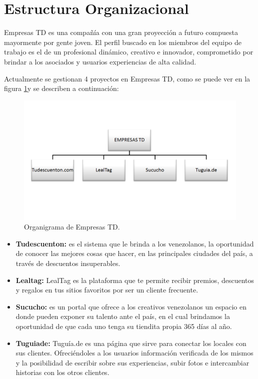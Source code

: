\section{Estructura Organizacional} \label{sect:Estructura_organizacional}

Empresas TD es una compañía con una gran proyección a futuro compuesta mayormente 
por gente joven. El perfil buscado en los miembros del equipo de trabajo es el de 
un profesional dinámico, creativo e innovador, comprometido por brindar a los
asociados y usuarios experiencias de alta calidad. 

Actualmente se gestionan 4 proyectos en Empresas TD, como se puede ver en la figura \ref{fig:ogtd}y se describen a continuación:

\begin{figure}[h]
	\begin{center}
		\includegraphics[scale=0.4]{imagenes/OrganigramaTD.png}
	\end{center}
	\caption{
		\label{fig:ogtd}
		Organigrama de Empresas TD.
	}
\end{figure}



\begin{itemize}
  \item \textbf{Tudescuenton:} es el sistema que le brinda a los venezolanos, la oportunidad de conocer las mejores cosas que hacer, en las principales ciudades del país, a través de descuentos insuperables\cite{TDC}.
  \item \textbf{Lealtag:} LealTag es la plataforma que te permite recibir premios, descuentos y regalos en tus sitios favoritos por ser un cliente frecuente\cite{LTG}.
  \item \textbf{Sucucho:} es un portal que ofrece a los creativos venezolanos un espacio en donde pueden exponer su talento ante el país, en el cual brindamos la oportunidad de que cada uno tenga su tiendita propia 365 días al año\cite{SCC}.
  \item \textbf{Tuguiade:} Tuguía.de es una página que sirve para conectar los locales con sus clientes. Ofreciéndoles a los usuarios información verificada de los mismos y la posibilidad de escribir sobre sus experiencias, subir fotos e intercambiar historias con los otros clientes\cite{TGD}. 
\end{itemize}
  
